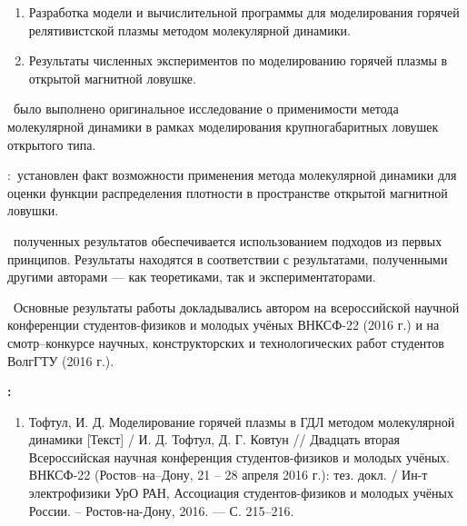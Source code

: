 \begin{enumerate}
  \item Разработка модели и вычислительной программы для моделирования горячей релятивистской плазмы методом молекулярной динамики.
  \item Результаты численных экспериментов по моделированию горячей плазмы в открытой магнитной ловушке.
\end{enumerate}

\novelty \ 
было выполнено оригинальное исследование о применимости метода молекулярной динамики в рамках моделирования крупногабаритных ловушек открытого типа.


\influence:\ установлен факт возможности применения метода молекулярной динамики для оценки функции распределения плотности в пространстве открытой магнитной ловушки.

\reliability\ полученных результатов обеспечивается использованием подходов из первых принципов. Результаты находятся в соответствии с результатами, полученными другими авторами --- как теоретиками, так и экспериментаторами.

\probation\
Основные результаты работы докладывались автором на всероссийской научной конференции студентов-физиков и молодых учёных ВНКСФ-22 (2016 г.) и на смотр--конкурсе научных, конструкторских и технологических работ студентов ВолгГТУ (2016 г.).


\publications\textbf{:}
\begin{enumerate}
	\item Тофтул, И. Д. Моделирование горячей плазмы в ГДЛ методом молекулярной динамики [Текст] / И. Д. Тофтул, Д. Г. Ковтун // Двадцать вторая Всероссийская научная конференция студентов-физиков и молодых учёных. ВНКСФ-22 (Ростов--на--Дону, 21 -- 28 апреля 2016 г.): тез. докл. / Ин-т электрофизики УрО РАН, Ассоциация студентов-физиков и молодых учёных России. – Ростов-на-Дону, 2016. --- С. 215--216.
\end{enumerate}
